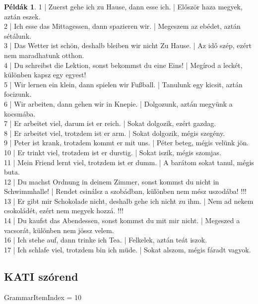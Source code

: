 \documentclass{article}
\theoremstyle{definition}
\newtheorem*{exmp}{Példák}
\begin{document}
\begin{exmp} %
1 | Zuerst gehe ich zu Hause, dann esse ich. | Először haza megyek, aztán eszek.\\
2 | Ich esse das Mittagessen, dann spazieren wir. | Megeszem az ebédet, aztán sétálunk.\\
3 | Das Wetter ist schön, deshalb bleiben wir nicht Zu Hause. | Az idő szép, ezért nem maradhatunk otthon.\\
4 | Du schreibst die Lektion, sonst bekommst du eine Eins! | Megírod a leckét, különben kapsz egy egyest!\\
5 | Wir lernen ein klein, dann spielen wir Fußball. | Tanulunk egy kicsit, aztán focizunk.\\
6 | Wir arbeiten, dann gehen wir in Knepie. | Dolgozunk, aztán megyünk a kocsmába.\\
7 | Er arbeitet viel, darum ist er reich. | Sokat dolgozik, ezért gazdag.\\
8 | Er arbeitet viel, trotzdem ist er arm. | Sokat dolgozik, mégis szegény.\\
9 | Peter ist krank, trotzdem kommt er mit uns. | Péter beteg, mégis velünk jön.\\
10 | Er trinkt viel, trotzdem ist er durstig. | Sokat iszik, mégis szomjas.\\
11 | Mein Friend lernt viel, trotzdem ist er dumm. | A barátom sokat tanul, mégis buta.\\
12 | Du machst Ordnung in deinem Zimmer, sonst kommst du nicht in Schwimmhalle! | Rendet csinálsz a szobádban, különben nem mész uszodába! !!!\\
13 | Er gibt mir Schokolade nicht, deshalb gehe ich nicht zu ihm. | Nem ad nekem csokoládét, ezért nem megyek hozzá. !!!\\
14 | Du kaufst das Abendessen, sonst kommst du mit mir nicht. | Megeszed a vacsorát, különben nem jössz velem.\\
16 | Ich stehe auf, dann trinke ich Tea. | Felkelek, aztán teát iszok.\\
17 | Ich schlafe viel, trotzdem bin ich müde. | Sokat alszom, mégis fáradt vagyok.\\
\end{exmp}

\subsection{KATI szórend}

GrammarItemIndex = 10
\end{document}
